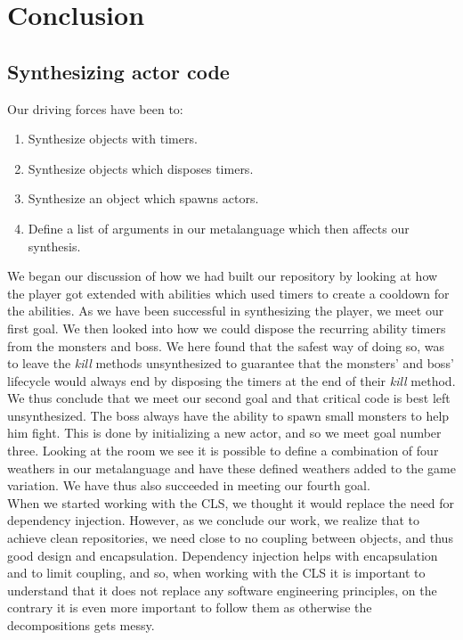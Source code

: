 \section{Conclusion}
\subsection{Synthesizing actor code}
Our driving forces have been to:
\begin{enumerate}
	\item Synthesize objects with timers.
	\item Synthesize objects which disposes timers.
	\item Synthesize an object which spawns actors.
	\item Define a list of arguments in our metalanguage which then affects our synthesis. 
\end{enumerate}
We began our discussion of how we had built our repository by looking at how the player got extended with abilities which used timers to create a cooldown for the abilities. As we have been successful in synthesizing the player, we meet our first goal. We then looked into how we could dispose the recurring ability timers from the monsters and boss. We here found that the safest way of doing so, was to leave the \textit{kill} methods unsynthesized to guarantee that the monsters' and boss' lifecycle would always end by disposing the timers at the end of their \textit{kill} method. We thus conclude that we meet our second goal and that critical code is best left unsynthesized. The boss always have the ability to spawn small monsters to help him fight. This is done by initializing a new actor, and so we meet goal number three. Looking at the room we see it is possible to define a combination of four weathers in our metalanguage and have these defined weathers added to the game variation. We have thus also succeeded in meeting our fourth goal.\\
When we started working with the CLS, we thought it would replace the need for dependency injection. However, as we conclude our work, we realize that to achieve clean repositories, we need close to no coupling between objects, and thus good design and encapsulation. Dependency injection helps with encapsulation and to limit coupling, and so, when working with the CLS it is important to understand that it does not replace any software engineering principles, on the contrary it is even more important to follow them as otherwise the decompositions gets messy.\\
